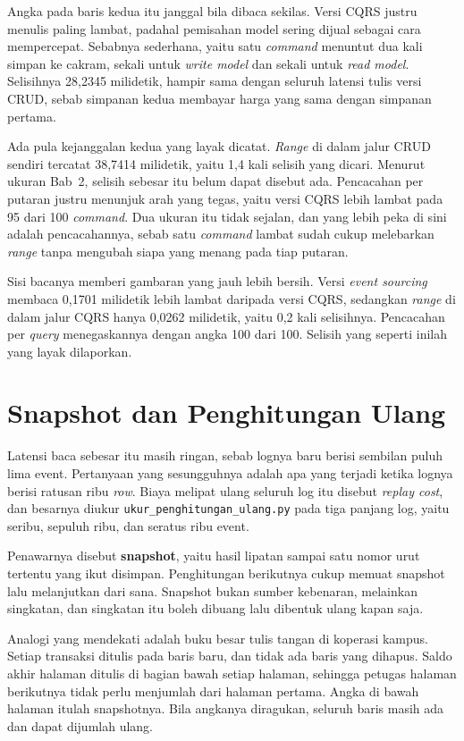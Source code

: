 Angka pada baris kedua itu janggal bila dibaca sekilas. Versi CQRS justru
menulis paling lambat, padahal pemisahan model sering dijual sebagai cara
mempercepat. Sebabnya sederhana, yaitu satu \textit{command} menuntut dua kali simpan
ke cakram, sekali untuk \textit{write model} dan sekali untuk \textit{read model}. Selisihnya
28,2345 milidetik, hampir sama dengan seluruh latensi tulis versi CRUD, sebab
simpanan kedua membayar harga yang sama dengan simpanan pertama.

Ada pula kejanggalan kedua yang layak dicatat.
\textit{Range} di dalam jalur
CRUD sendiri tercatat 38,7414 milidetik, yaitu 1,4 kali selisih yang dicari.
Menurut ukuran Bab~2, selisih sebesar itu belum dapat disebut
ada. Pencacahan per putaran justru menunjuk arah yang tegas, yaitu versi CQRS
lebih lambat pada 95 dari 100 \textit{command}. Dua ukuran itu tidak sejalan, dan yang
lebih peka di sini adalah pencacahannya, sebab satu \textit{command} lambat sudah cukup
melebarkan \textit{range} tanpa mengubah siapa yang menang pada tiap putaran.

Sisi bacanya memberi gambaran yang jauh lebih bersih. Versi \textit{event
sourcing} membaca 0,1701 milidetik lebih lambat daripada versi CQRS, sedangkan
\textit{range} di dalam jalur CQRS hanya 0,0262 milidetik, yaitu 0,2 kali
selisihnya. Pencacahan per \textit{query} menegaskannya dengan angka 100 dari 100.
Selisih yang seperti inilah yang layak dilaporkan.

\section{Snapshot dan Penghitungan Ulang}

Latensi baca sebesar itu masih ringan, sebab lognya baru berisi sembilan puluh
lima event. Pertanyaan yang sesungguhnya adalah apa yang terjadi ketika
lognya berisi ratusan ribu \textit{row}. Biaya melipat ulang seluruh log itu disebut
\textit{replay cost}, dan besarnya diukur
\texttt{ukur\_penghitungan\_ulang.py} pada tiga panjang log, yaitu seribu,
sepuluh ribu, dan seratus ribu event.

Penawarnya disebut \textbf{snapshot}, yaitu hasil lipatan sampai satu nomor
urut tertentu yang ikut disimpan. Penghitungan berikutnya cukup memuat snapshot
lalu melanjutkan dari sana. Snapshot bukan sumber kebenaran, melainkan
singkatan, dan singkatan itu boleh dibuang lalu dibentuk ulang kapan saja.

Analogi yang mendekati adalah buku besar tulis tangan di koperasi kampus.
Setiap transaksi ditulis pada baris baru, dan tidak ada baris yang dihapus.
Saldo akhir halaman ditulis di bagian bawah setiap halaman, sehingga petugas
halaman berikutnya tidak perlu menjumlah dari halaman pertama. Angka di bawah
halaman itulah snapshotnya. Bila angkanya diragukan, seluruh baris masih ada
dan dapat dijumlah ulang.

